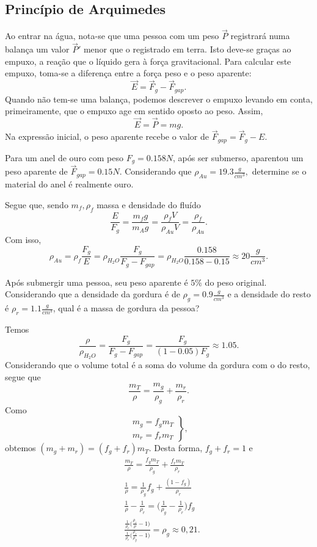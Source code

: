 \documentclass[physicsII_notes.tex]{subfiles}
\begin{document}
\subsection{Princípio de Arquimedes}
Ao entrar na água, nota-se que uma pessoa com um peso \(\vec{P}\) registrará numa balança um valor \(\vec{P}'\) menor que o registrado em terra. Isto deve-se graças ao empuxo,
a reação que o líquido gera à força gravitacional. Para calcular este empuxo, toma-se a diferença entre a força peso e o peso aparente:
\[
	\vec{E} = \vec{F}_{g}-\vec{F}_{gap}.
\]
Quando não tem-se uma balança, podemos descrever o empuxo levando em conta, primeiramente, que o empuxo age em sentido oposto ao peso. Assim,
\[
	\vec{E} = \vec{P} = mg.
\]
Na expressão inicial, o peso aparente recebe o valor de \(\vec{F}_{gap}=\vec{F}_{g} - E\).
\begin{example}
	Para um anel de ouro com peso \(F_{g} = 0.158N\), após ser submerso, aparentou um peso aparente de \(\vec{F}_{gap}=0.15N\). Considerando que
	\(\rho_{Au} = 19.3\frac{g}{cm^{3}},\) determine se o material do anel é realmente ouro.

	Segue que, sendo \(m_{f}, \rho_{f}\) massa e densidade do fluído
	\[
		\frac{E}{F_{g}} = \frac{m_{f}g}{m_{A}g} = \frac{\rho_{f}V}{\rho_{Au}V} = \frac{\rho_{f}}{\rho_{Au}}.
	\]
	Com isso,
	\[
		\rho_{Au} = \rho_{f}\frac{F_{g}}{E} = \rho_{H_{2}O}\frac{F_{g}}{F_{g}-F_{gap}}=\rho_{H_{2}O}\frac{0.158}{0.158-0.15}\approx 20\frac{g}{cm^{3}}.
	\]
\end{example}
\begin{example}
	Após submergir uma pessoa, seu peso aparente é \(5\%\) do peso original. Considerando que a densidade da gordura é de
	\(\rho_{g} = 0.9 \frac{g}{cm^{3}}\) e a densidade do resto é \(\rho_{r} = 1.1 \frac{g}{cm^{3}}\), qual é a massa de gordura da pessoa?

	Temos
	\[
		\frac{\rho }{\rho_{H_{2}O}} = \frac{F_{g}}{F_{g}-F_{gap}} = \frac{F_{g}}{(1-0.05)F_{g}}\approx 1.05.
	\]
	Considerando que o volume total é a soma do volume da gordura com o do resto, segue que
	\[
		\frac{m_{T}}{\rho }= \frac{m_{g}}{\rho_{g}}+\frac{m_{r}}{\rho_{r}}.
	\]
	Como
	\[
		\left.\begin{array}{ll}
			m_{g} = f_{g}m_{T} \\
			m_{r} = f_{r}m_{T}
		\end{array}\right\},
	\]
	obtemos \((m_{g}+m_{r}) = (f_{g}+f_{r})m_{T}.\) Desta forma, \(f_{g}+f_{r}=1\) e
	\begin{align*}
		 & \frac{m_{T}}{\rho } = \frac{f_{g}m_{T}}{\rho_{g}} + \frac{f_{r}m_{T}}{\rho_{r}}                                                                     \\
		 & \frac{1}{\rho }=\frac{1}{\rho_{g}}f_{g} + \frac{(1-f_{g})}{\rho_{r}}                                                                                \\
		 & \frac{1}{\rho }-\frac{1}{\rho_{r}}=\biggl(\frac{1}{\rho_{g}}-\frac{1}{\rho_{r}}\biggr)f_{g}                                                         \\
		 & \frac{\frac{1}{\rho_{r}}\biggl(\frac{\rho_{r}}{\rho }-1\biggr)}{\frac{1}{\rho_{r}}\biggl(\frac{\rho_{r}}{\rho_{g}}-1\biggr)} = \rho_{g}\approx0,21.
	\end{align*}
\end{example}
\end{document}
